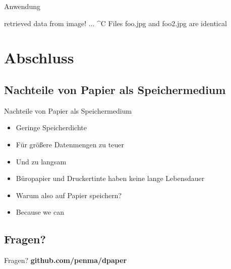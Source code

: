 \begin{frame}[fragile]{Anwendung}
	\small\begin{semiverbatim}

retrieved data from image!
... ^C \pause
Files foo.jpg and foo2.jpg are identical
\end{semiverbatim}
\end{frame}

\section{Abschluss}

\subsection{Nachteile von Papier als Speichermedium}
\begin{frame}[<+->]{Nachteile von Papier als Speichermedium}
	\begin{itemize}
	\item Geringe Speicherdichte
	\item Für größere Datenmengen zu teuer
	\item Und zu langsam
	\item Büropapier und Druckertinte haben keine lange Lebensdauer
	\item Warum also auf Papier speichern?
	\item Because we can
	\end{itemize}
\end{frame}

\subsection{Fragen?}
\begin{frame}{Fragen?}
	\hfill\textbf{github.com/penma/dpaper}\hfill\hbox{}
\end{frame}

